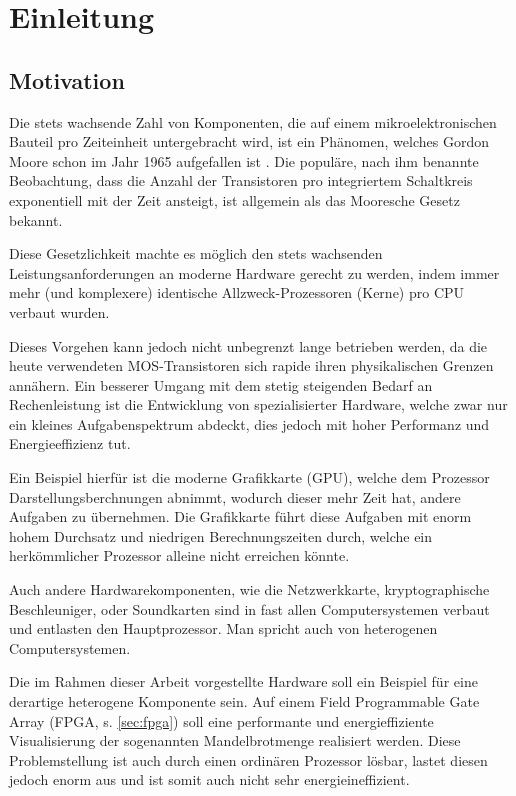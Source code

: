 \documentclass[a4paper,12pt,onesided]{report}
\begin{document}
\newpage
\chapter{Einleitung}

\section{Motivation}
Die stets wachsende Zahl von Komponenten, die auf einem mikroelektronischen Bauteil pro Zeiteinheit untergebracht wird, ist ein Phänomen, welches Gordon Moore schon im Jahr 1965 aufgefallen ist \cite{moore1965cramming}. Die populäre, nach ihm benannte Beobachtung, dass die Anzahl der Transistoren pro integriertem Schaltkreis exponentiell mit der Zeit ansteigt, ist allgemein als das Mooresche Gesetz bekannt.

Diese Gesetzlichkeit machte es möglich den stets wachsenden Leistungsanforderungen an moderne Hardware gerecht zu werden, indem immer mehr (und komplexere) identische Allzweck-Prozessoren (Kerne) pro CPU verbaut wurden.

Dieses Vorgehen kann jedoch nicht unbegrenzt lange betrieben werden, da die heute verwendeten MOS-Transistoren sich rapide ihren physikalischen Grenzen annähern. Ein besserer Umgang mit dem stetig steigenden Bedarf an Rechenleistung ist die Entwicklung von spezialisierter Hardware, welche zwar nur ein kleines Aufgabenspektrum abdeckt, dies jedoch mit hoher Performanz und Energieeffizienz tut.

Ein Beispiel hierfür ist die moderne Grafikkarte (GPU), welche dem Prozessor Darstellungsberchnungen abnimmt, wodurch dieser mehr Zeit hat, andere Aufgaben zu übernehmen. Die Grafikkarte führt diese Aufgaben mit enorm hohem Durchsatz und niedrigen Berechnungszeiten durch, welche ein herkömmlicher Prozessor alleine nicht erreichen könnte.

Auch andere Hardwarekomponenten, wie die Netzwerkkarte, kryptographische Beschleuniger, oder Soundkarten sind in fast allen Computersystemen verbaut und entlasten den Hauptprozessor. Man spricht auch von heterogenen Computersystemen.

Die im Rahmen dieser Arbeit vorgestellte Hardware soll ein Beispiel für eine derartige heterogene Komponente sein. Auf einem Field Programmable Gate Array (FPGA, s. \autoref{sec:fpga}) soll eine performante und energieffiziente Visualisierung der sogenannten Mandelbrotmenge realisiert werden.
Diese Problemstellung ist auch durch einen ordinären Prozessor lösbar, lastet diesen jedoch enorm aus und ist somit auch nicht sehr energieineffizient.
\end{document}
